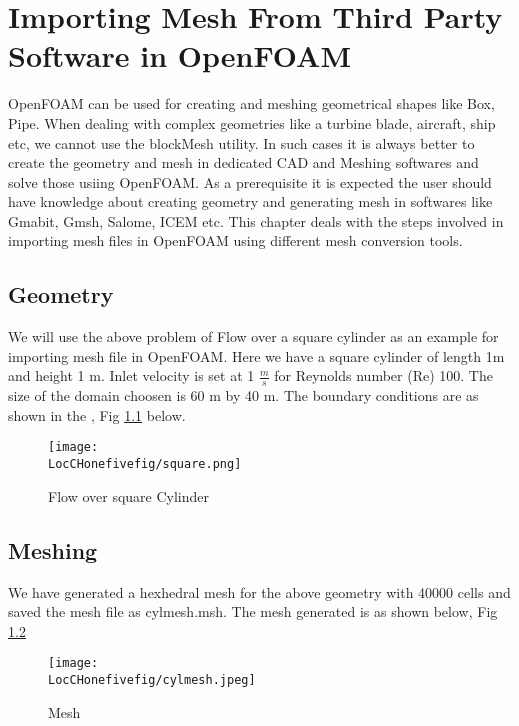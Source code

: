 \chapter{Importing Mesh From Third Party Software in OpenFOAM}
\thispagestyle{empty}
\label{sec:chap9}
\newcommand{\LocCHninefig}{\Origin/CHAPTERS/chap15/figures}

OpenFOAM can be used for creating and meshing geometrical shapes like Box, Pipe. When dealing with complex geometries like a turbine blade, aircraft,
ship etc, we cannot use the blockMesh utility. In such cases it is always better to create the geometry and mesh in dedicated CAD and Meshing softwares 
and solve those usiing OpenFOAM. As a prerequisite it is expected the user should have knowledge about creating geometry and generating mesh in softwares
like Gmabit, Gmsh, Salome, ICEM etc. This chapter deals with the steps involved in importing mesh files in OpenFOAM using different mesh conversion tools.

\section{Geometry}

We will use the above problem of Flow over a square cylinder as an example for importing mesh file in OpenFOAM. Here we have a square cylinder
of length 1m and height 1 m. Inlet velocity is set at 1 $\frac{m}{s}$ for Reynolds number (Re) 100. The size of the domain choosen is 60 m by 40 m.
The boundary conditions are as shown in the , Fig \ref{square} below.

\begin{figure}[t]  
\centering  
\texttt{[image: \\LocCHonefivefig/square.png]}
\caption{Flow over square Cylinder}
\label{square}  
\end{figure}

\section{Meshing}

We have generated a hexhedral mesh for the above geometry with 40000 cells and saved the mesh file as cylmesh.msh. 
The mesh generated is as shown below, Fig \ref{mesh} 

\begin{figure}[h]  
\centering
\texttt{[image: \\LocCHonefivefig/cylmesh.jpeg]}
\caption{Mesh}
\label{mesh}
  
\end{figure}

